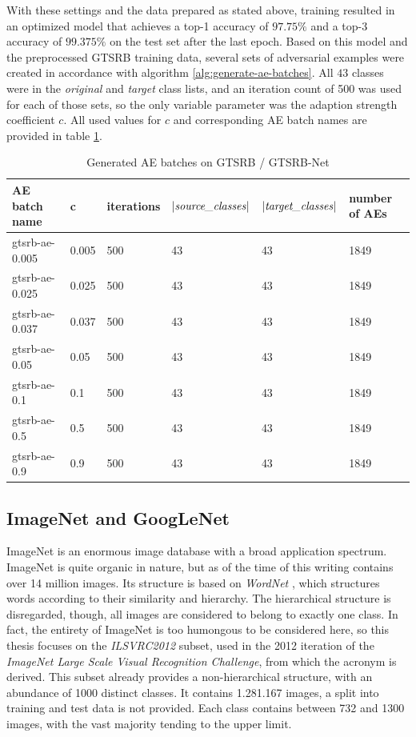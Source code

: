 \documentclass[11pt, a4paper]{article}
\newcommand{\abs}[1]{\left\lvert#1\right\rvert}
\begin{document}
With these settings and the data prepared as stated above, training resulted in an optimized model that achieves a top-1 accuracy of $97.75\%$ and a top-3 accuracy of $99.375\%$ on the test set after the last epoch. Based on this model and the preprocessed GTSRB training data, several sets of adversarial examples were created in accordance with algorithm \ref{alg:generate-ae-batches}. All $43$ classes were in the \emph{original} and \emph{target} class lists, and an iteration count of 500 was used for each of those sets, so the only variable parameter was the adaption strength coefficient $c$. All used values for $c$ and corresponding AE batch names are provided in table \ref{tab:gtsrb-ae-batches}.

\begin{table}[h!tb]
	\centering
	\begin{tabular}{|l|l|l|l|l|l|}
		\hline
		AE batch name & c & iterations & $\abs{\text{\emph{source\_classes}}}$ & $\abs{\text{\emph{target\_classes}}}$ & number of AEs \\
		\hline
		gtsrb-ae-0.005 & 0.005 & 500 & 43 & 43 & 1849 \\
		gtsrb-ae-0.025 & 0.025 & 500 & 43 & 43 & 1849 \\
		gtsrb-ae-0.037 & 0.037 & 500 & 43 & 43 & 1849 \\
		gtsrb-ae-0.05 & 0.05 & 500 & 43 & 43 & 1849 \\
		gtsrb-ae-0.1 & 0.1 & 500 & 43 & 43 & 1849 \\
		gtsrb-ae-0.5 & 0.5 & 500 & 43 & 43 & 1849 \\
		gtsrb-ae-0.9 & 0.9 & 500 & 43 & 43 & 1849 \\
		\hline
	\end{tabular}
	\caption[Description of AE batches generated on GTSRB / GTSRB-Net]{Generated AE batches on GTSRB / GTSRB-Net}
	\label{tab:gtsrb-ae-batches}
\end{table}

\subsection{ImageNet and GoogLeNet}
\label{sec:generation-large-sets:imagenet}
ImageNet \cite{imagenet-large-scale-hierarchical-image-database} is an enormous image database with a broad application spectrum. ImageNet is quite organic in nature, but as of the time of this writing contains over 14 million images. Its structure is based on \emph{WordNet} \cite{wordnet-a-lexical-database-for-english}, which structures words according to their similarity and hierarchy. The hierarchical structure is disregarded, though, all images are considered to belong to exactly one class. In fact, the entirety of ImageNet is too humongous to be considered here, so this thesis focuses on the \emph{ILSVRC2012} subset, used in the 2012 iteration of the \emph{ImageNet Large Scale Visual Recognition Challenge}, from which the acronym is derived. This subset already provides a non-hierarchical structure, with an abundance of 1000 distinct classes. It contains 1.281.167 images, a split into training and test data is not provided. Each class contains between 732 and 1300 images, with the vast majority tending to the upper limit.
\end{document}
